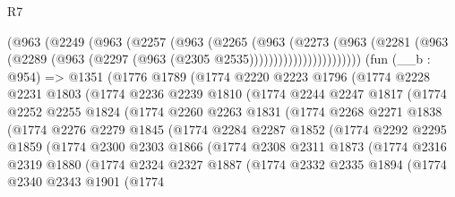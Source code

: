 \begin{lexlean}{R7}
\begin{coremodule}
                  (@963
                    (@2249
                      (@963
                        (@2257
                          (@963
                            (@2265
                              (@963
                                (@2273
                                  (@963
                                    (@2281
                                      (@963
                                        (@2289
                                          (@963 (@2297 (@963 (@2305 @2535)))))))))))))))))))))))
    (fun (__b : @954) =>
    @1351
      (@1776
        @1789
        (@1774
          @2220
          @2223
          @1796
          (@1774
            @2228
            @2231
            @1803
            (@1774
              @2236
              @2239
              @1810
              (@1774
                @2244
                @2247
                @1817
                (@1774
                  @2252
                  @2255
                  @1824
                  (@1774
                    @2260
                    @2263
                    @1831
                    (@1774
                      @2268
                      @2271
                      @1838
                      (@1774
                        @2276
                        @2279
                        @1845
                        (@1774
                          @2284
                          @2287
                          @1852
                          (@1774
                            @2292
                            @2295
                            @1859
                            (@1774
                              @2300
                              @2303
                              @1866
                              (@1774
                                @2308
                                @2311
                                @1873
                                (@1774
                                  @2316
                                  @2319
                                  @1880
                                  (@1774
                                    @2324
                                    @2327
                                    @1887
                                    (@1774
                                      @2332
                                      @2335
                                      @1894
                                      (@1774
                                        @2340
                                        @2343
                                        @1901
                                        (@1774

\end{coremodule}
\end{lexlean}
